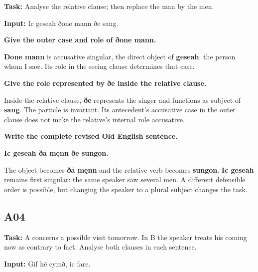 \textbf{Task:} Analyse the relative clause; then replace the man by the men.

\textbf{Input:} Ic geseah ðone mann ðe sang.

\textbf{Give the outer case and role of ðone mann.}

\textbf{Ðone mann} is accusative singular, the direct object of \textbf{geseah}: the person whom I saw. Its role in the seeing clause determines that case.

\textbf{Give the role represented by ðe inside the relative clause.}

Inside the relative clause, \textbf{ðe} represents the singer and functions as subject of \textbf{sang}. The particle is invariant. Its antecedent's accusative case in the outer clause does not make the relative's internal role accusative.

\textbf{Write the complete revised Old English sentence.}

\textbf{Ic geseah ðā męnn ðe sungon.}

The object becomes \textbf{ðā męnn} and the relative verb becomes \textbf{sungon}. \textbf{Ic geseah} remains first singular: the same speaker saw several men. A different defensible order is possible, but changing the speaker to a plural subject changes the task.

\subsection*{A04}

\textbf{Task:} A concerns a possible visit tomorrow. In B the speaker treats his coming now as contrary to fact. Analyse both clauses in each sentence.

\textbf{Input:} Gif hē cymð, ic fare.

